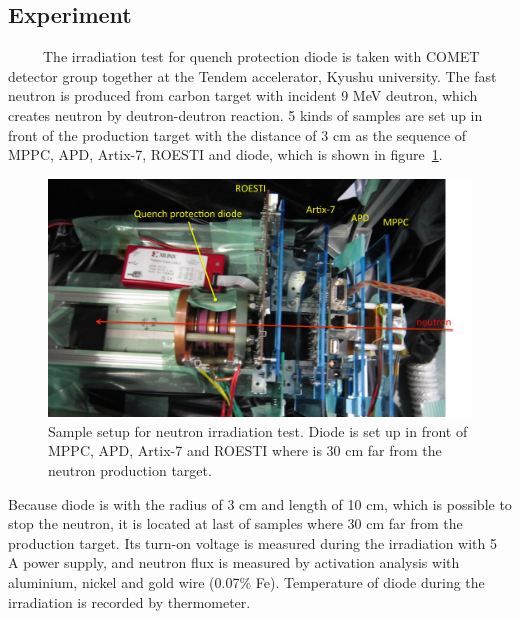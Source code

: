   \subsection{Experiment}
~~~~~The irradiation test for quench protection diode is taken with COMET detector group together at the Tendem accelerator, Kyushu university.
The fast neutron is produced from carbon target with incident 9 MeV deutron, which creates neutron by deutron-deutron reaction.
5 kinds of samples are set up in front of the production target with the distance of 3 cm as the sequence of MPPC, APD, Artix-7, ROESTI and diode, which is shown in figure~\ref{3setup}.
 \begin{figure}[H]
  \centering
  \includegraphics[scale=0.45]{chapter4/fig/diodepic.pdf}
  \caption{Sample setup for neutron irradiation test. Diode is set up in front of MPPC, APD, Artix-7 and ROESTI where is 30 cm far from the neutron production target.}
  \label{3setup}
 \end{figure}
Because diode is with the radius of 3 cm and length of 10 cm, which is possible to stop the neutron, it is located at last of samples where 30 cm far from the production target.
Its turn-on voltage is measured during the irradiation with 5 A power supply, and neutron flux is measured by activation analysis with aluminium, nickel and gold wire (0.07\% Fe).
Temperature of diode during the irradiation is recorded by thermometer.
  
